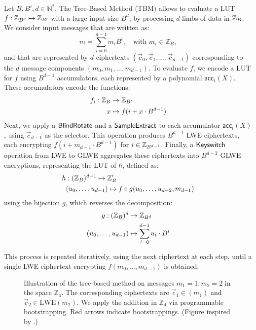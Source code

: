 Let $B, B', d \in \mathbb N^*$. The Tree-Based Method (TBM) allows to evaluate a LUT $f: \mathbb{Z}_{B^d} \mapsto \mathbb{Z}_ {B'}$ with a large input size $B^d$, by processing $d$ limbs of data in $\mathbb{Z}_B$. We consider input messages that are written as:
$$
    m = \sum_{i=0}^{d-1} m_i B^i, \quad \text{with } m_i \in \mathbb{Z}_B,
$$
and that are represented by $d$ ciphertexts $(\vec c_0, \vec c_1, \dots, \vec c_{d-1})$ corresponding to the $d$ message components $(m_0, m_1, \dots, m_{d-1})$. 
%
To evaluate $f$, we encode a LUT for $f$ using $B^{d-1}$ accumulators, each represented by a polynomial $\textsf{acc}_i(X)$. These accumulators encode the functions:
%
    \begin{align*}
        f_i: \mathbb{Z}_B &\rightarrow \mathbb{Z}_{B'}\\
             x &\mapsto f(i + x \cdot B^{d-1})
    \end{align*}
%
Next, we apply a $\sf{BlindRotate}$ and a $\sf{SampleExtract}$ to each accumulator $\textsf{acc}_i(X)$, using $\vec c_{d-1}$ as the selector. This operation produces $B^{d-1}$ LWE ciphertexts, each encrypting $f (i + m_{d-1} \cdot B^{d-1})$ for $i \in \mathbb{Z}_{B^{d-1}}$.
%    
Finally, a $\sf{Keyswitch}$ operation from LWE to GLWE aggregates these ciphertexts into $B^{d-2}$ GLWE encryptions, representing the LUT of $h$, defined as:
    \begin{align*}
        h &: (\mathbb{Z}_{B})^{d-1} \mapsto \mathbb{Z}_B' \\
          & (u_0, \dots, u_{d-1}) \mapsto f \circ g(u_0, \dots, u_{d-2}, m_{d-1})
    \end{align*}
using the bijection $g$, which reverses the decomposition:
    \begin{align*}
        g: (\mathbb{Z}_B)^d &\rightarrow \mathbb{Z}_{B^d} \\
           (u_0, \dots, u_{d-1}) &\mapsto \sum_{i=0}^{d-1} u_i \cdot B^i
    \end{align*} 

This process is repeated iteratively, using the next ciphertext at each step, until a single LWE ciphertext encrypting $f(m_0, \dots, m_{d-1})$ is obtained.  

\begin{figure}
    \centering
    \caption{Illustration of the tree-based method on messages  $m_1 = 1, m_2=2$ in the space  $\mathbb{Z}_4$. The corresponding ciphertexts are $\vec c_1 \in \mathrm{}(m_1)$ and $\vec c_2 \in \mathrm{LWE}(m_2)$. We apply the addition in $\mathbb{Z}_4$ via programmable bootstrapping. Red arrows indicate bootstrappings. (Figure inspired by \cite{DBLP:conf/wahc/TramaCBS23}.)}
    \label{fig:my_label}
\end{figure}

